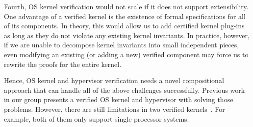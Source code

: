 Fourth, OS kernel verification would not scale if it does not  support extensibility.
One advantage of a verified kernel is the existence of formal specifications for all of its components. 
In theory, this would allow us to add certified kernel plug-ins as long as they do not violate any existing kernel invariants.
In practice, however, if we are unable to decompose kernel invariants into small independent pieces, even modifying an existing (or adding a new) verified component may force us to rewrite the proofs for the entire kernel.

Hence, OS kernel and hypervisor verification needs a novel compositional approach that can handle all of the above challenges successfully. 
Previous work~\cite{dscal15} in our group presents a verified OS kernel and hypervisor with solving those problems. 
However, there are still limitations in two verified kernels~\cite{dscal15, klein2009sel4}.
For example, both of them only support single processor systems.